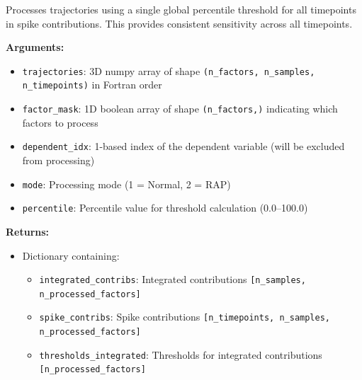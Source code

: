 \begin{enumerate}
\begin{enumerate}
                  Processes trajectories using a single global percentile threshold for all
                  timepoints in spike contributions. This provides consistent
                  sensitivity across all timepoints.
                  
                  \textbf{Arguments:}
                  \begin{itemize}
                    \item \texttt{trajectories}: 3D numpy array of shape \texttt{(n\_factors,
                          n\_samples, n\_timepoints)} in Fortran order
                    
                    \item \texttt{factor\_mask}: 1D boolean array of shape \texttt{(n\_factors,)}
                          indicating which factors to process
                          
                    \item \texttt{dependent\_idx}: 1-based index of the dependent variable
                          (will be excluded from processing)
                          
                    \item \texttt{mode}: Processing mode (1 = Normal, 2 = RAP)
                          
                    \item \texttt{percentile}: Percentile value for threshold calculation
                          (0.0--100.0)
                  \end{itemize}
                  \textbf{Returns:}
                  \begin{itemize}
                    \item Dictionary containing:
                          \begin{itemize}
                            \item \texttt{integrated\_contribs}: Integrated contributions \texttt{[n\_samples,
                                  n\_processed\_factors]}
                            
                            \item \texttt{spike\_contribs}: Spike contributions \texttt{[n\_timepoints,
                                  n\_samples, n\_processed\_factors]}
                            
                            \item \texttt{thresholds\_integrated}: Thresholds for integrated
                                  contributions \texttt{[n\_processed\_factors]}
                                  

\end{itemize}
\end{itemize}
\end{enumerate}
\end{enumerate}

